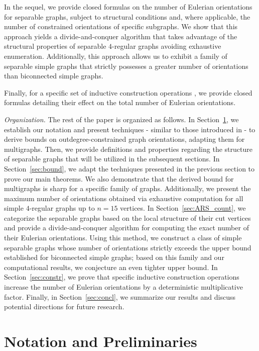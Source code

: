 \documentclass{article}
\begin{document}
        In the sequel, we provide closed formulas on the number of Eulerian orientations for separable graphs, subject to structural conditions and, where applicable, the number of constrained orientations of specific subgraphs.
        We show that this approach yields a divide-and-conquer algorithm that takes advantage of the structural properties of separable $4$-regular graphs avoiding exhaustive enumeration.
        Additionally, this approach allows us to exhibit a family of separable simple graphs that strictly possesses a greater number of orientations than biconnected simple graphs.

        Finally, for a specific set of inductive construction operations \cite{Bories1983, DING2003329}, we provide closed formulas detailing their effect on the total number of Eulerian orientations.

        \medskip\textit{Organization.} 
        The rest of the paper is organized as follows. 
        In Section~\ref{sec:pre}, we establish our notation and present techniques - similar to those introduced in \cite{bev, bet} - to derive bounds on outdegree-constrained graph orientations, adapting them for multigraphs.
        Then, we provide definitions and properties regarding the structure of separable graphs that will be utilized in the subsequent sections.
        In Section~\ref{sec:bound}, we adapt the techniques presented in the previous section to prove our main theorems.
        We also demonstrate that the derived bound for multigraphs is sharp for a specific family of graphs.
        Additionally, we present the maximum number of orientations obtained via exhaustive computation for all simple $4$-regular graphs up to $n=15$ vertices.
        In Section~\ref{sec:ARS_count}, we categorize the separable graphs based on the local structure of their cut vertices and provide a divide-and-conquer algorithm for computing the exact number of their Eulerian orientations.
        Using this method, we construct a class of simple separable graphs whose number of orientations strictly exceeds the upper bound established for biconnected simple graphs; based on this family and our computational results, we conjecture an even tighter upper bound. 
        In Section~\ref{sec:constr}, we prove that specific inductive construction operations increase the number of Eulerian orientations by a deterministic multiplicative factor.
        Finally, in Section~\ref{sec:concl}, we summarize our results and discuss potential directions for future research.

    \section{Notation and Preliminaries}\label{sec:pre}
\end{document}
